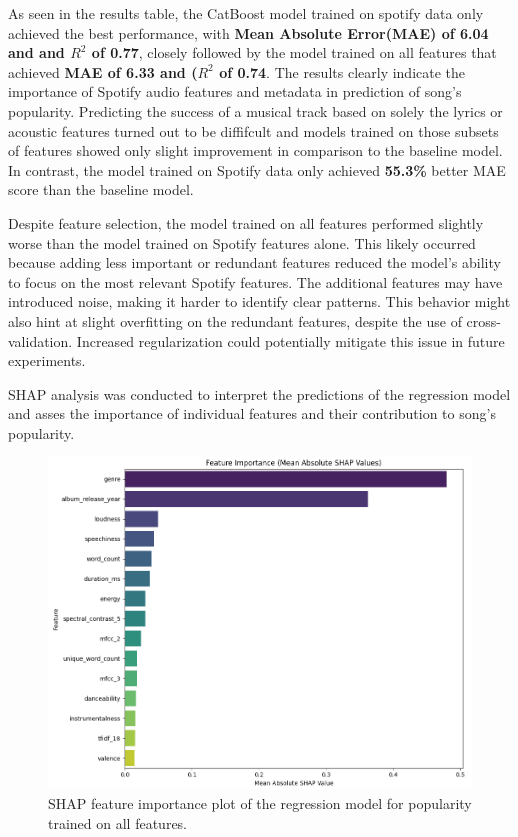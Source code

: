 As seen in the results table, the CatBoost model trained on spotify data only
achieved the best performance, with \textbf{Mean Absolute Error(MAE) of
\textbf{6.04} and and $R^2$ of 0.77}, closely followed by the model trained on
all features that achieved \textbf{MAE of 6.33 and ($R^2$ of 0.74}. The results
clearly indicate the importance of Spotify audio features and metadata in
prediction of song's popularity. Predicting the success  of a musical track
based on solely the lyrics or acoustic features turned out to be diffifcult and
models trained on those subsets of features showed only slight improvement in
comparison to the baseline model. In contrast, the model trained on Spotify data only
achieved \textbf{55.3\%} better MAE score than the baseline model.

Despite feature selection, the model trained on all features performed slightly
worse than the model trained on Spotify features alone. This likely occurred
because adding less important or redundant features reduced the model's ability
to focus on the most relevant Spotify features. The additional features may
have introduced noise, making it harder to identify clear patterns. This
behavior might also hint at slight overfitting on the redundant features,
despite the use of cross-validation. Increased regularization could potentially
mitigate this issue in future experiments.


SHAP analysis was conducted to interpret the predictions of the regression
model and asses the importance of individual features and their contribution to
song's popularity.


\begin{center}
\begin{figure}[H]
  \centering
  \includegraphics[width=5in]{img/feature_importance_popularity_reg.png}
  \caption{SHAP feature importance plot of the regression model for popularity trained on all features.}
  \label{Figure:fig_beh}
\end{figure}
\end{center}


